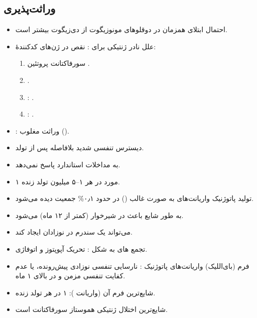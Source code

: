 \documentclass[12pt,a4paper]{article}
\begin{document}
\subsection*{وراثت‌پذیری }
\begin{itemize}
\item احتمال ابتلای همزمان در دوقلوهای مونوزیگوت از دی‌زیگوت بیشتر است.
\item علل نادر ژنتیکی برای : نقص در ژن‌های کدکنندهٔ:
\begin{enumerate}
\item سورفاکتانت پروتئین .
\item {}.
\item {}: .
\item {}: .
\end{enumerate}
\item {}: وراثت مغلوب ().
\item دیسترس تنفسی شدید بلافاصله پس از تولد.
\item به مداخلات استاندارد پاسخ نمی‌دهد.
\item ۱ مورد در هر ۱–۵ میلیون تولد زنده.
\end{itemize}

\begin{itemize}
\item تولید پاتوژنیک واریانت‌های  به صورت غالب () در حدود ۰٫۱\% جمعیت دیده می‌شود.
\item به طور شایع باعث  در شیرخوار (کمتر از ۱۲ ماه) می‌شود.
\item می‌تواند یک سندرم  در نوزادان ایجاد کند.
\item تجمع های به شکل : تحریک آپوپتوز و اتوفاژی.
\item فرم  (بای‌اللیک) واریانت‌های پاتوژنیک : نارسایی تنفسی نوزادی پیش‌رونده، یا عدم کفایت تنفسی مزمن و  در بالای ۱ ماه.
\item شایع‌ترین فرم آن (واریانت ): ۱ در هر  تولد زنده.
\item {} شایع‌ترین اختلال ژنتیکی هموستاز سورفاکتانت است.
\end{itemize}
\end{document}
